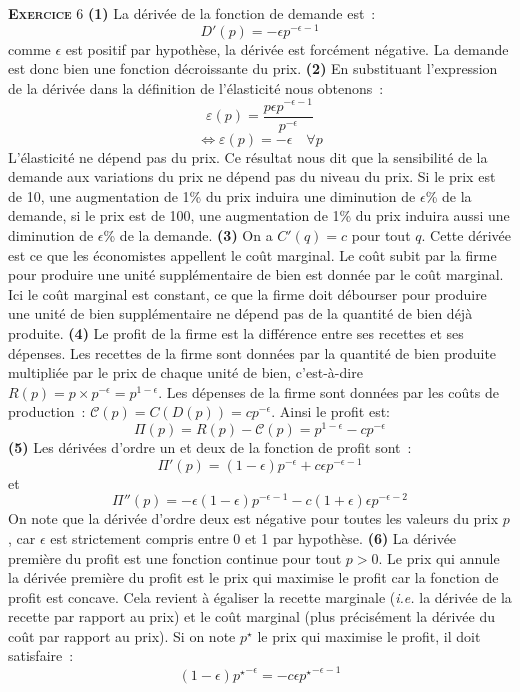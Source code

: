 \documentclass[10pt,a4paper,notitlepage]{article}
\newcommand{\exercice}[1]{\textsc{\textbf{Exercice}} #1}
\begin{document}
\exercice{6} \textbf{(1)} La dérivée de la fonction de demande est :
\[
D'(p) = -\epsilon p^{-\epsilon-1}
\]
comme $\epsilon$ est positif par hypothèse, la dérivée est forcément négative. La demande est donc bien une fonction décroissante du prix. \textbf{(2)} En substituant l'expression de la dérivée dans la définition de l'élasticité nous obtenons :
\[
\varepsilon (p) = \frac{p \epsilon p^{-\epsilon-1}}{p^{-\epsilon}}
\]
\[
\Leftrightarrow \varepsilon (p) = -\epsilon\quad\forall p
\]
L'élasticité ne dépend pas du prix. Ce résultat nous dit que la
sensibilité de la demande aux variations du prix ne dépend pas du
niveau du prix. Si le prix est de 10, une augmentation de 1\% du prix
induira une diminution de $\epsilon$\% de la demande, si le prix est
de 100, une augmentation de 1\% du prix induira aussi une diminution
de $\epsilon$\% de la demande. \textbf{(3)} On a $C'(q) = c$ pour tout
$q$. Cette dérivée est ce que les économistes appellent le coût
marginal. Le coût subit par la firme pour produire une unité
supplémentaire de bien est donnée par le coût marginal. Ici le coût
marginal est constant, ce que la firme doit débourser pour produire
une unité de bien supplémentaire ne dépend pas de la quantité de bien
déjà produite. \textbf{(4)} Le profit de la firme est la différence
entre ses recettes et ses dépenses. Les recettes de la firme sont
données par la quantité de bien produite multipliée par le prix de
chaque unité de bien, c'est-à-dire
$R(p) = p\times p^{-\epsilon} = p^{1-\epsilon}$. Les dépenses de la
firme sont données par les coûts de production :
$\mathcal C(p) = C(D(p)) = c p^{-\epsilon}$. Ainsi le profit est:
\[
\Pi(p) = R(p)-\mathcal C(p) = p^{1-\epsilon} - c p^{-\epsilon} 
\]
\textbf{(5)} Les dérivées d'ordre un et deux de la fonction de profit sont :
\[
\Pi'(p) = (1-\epsilon)p^{-\epsilon} + c \epsilon p^{-\epsilon-1}
\]
et
\[
\Pi''(p) = -\epsilon(1-\epsilon)p^{-\epsilon-1} - c(1+\epsilon) \epsilon p^{-\epsilon-2}
\]
On note que la dérivée d'ordre deux est négative pour toutes les
valeurs du prix $p$, car $\epsilon$ est strictement compris entre 0 et
1 par hypothèse. \textbf{(6)} La dérivée première du profit est une
fonction continue pour tout $p>0$. Le prix qui annule la dérivée
première du profit est le prix qui maximise le profit car la fonction
de profit est concave. Cela revient à égaliser la recette marginale
(\emph{i.e.} la dérivée de la recette par rapport au prix) et le coût
marginal (plus précisément la dérivée du coût par rapport au prix). Si
on note $p^{\star}$ le prix qui maximise le profit, il doit
satisfaire :
\[
  (1-\epsilon){p^{\star}}^{-\epsilon} = - c \epsilon {p^{\star}}^{-\epsilon-1}
\]
\end{document}
